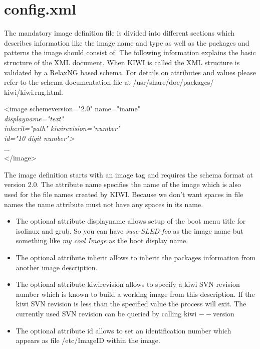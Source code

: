 \section{config.xml}
The mandatory image definition file is divided into different sections
which describes information like the image name and type as well as
the packages and patterns the image should consist of. The following
information explains the basic structure of the XML document. When KIWI
is called the XML structure is validated by a RelaxNG based schema.
For details on attributes and values please refer to the schema 
documentation file at /usr/share/doc/packages/ kiwi/kiwi.rng.html.

\begin{Command}{12cm}
<image schemeversion="2.0" name="iname"\\
\hspace*{1.9cm}\textit{displayname="text"}\\
\hspace*{1.9cm}\textit{inherit="path" kiwirevision="number"}\\
\hspace*{1.9cm}\textit{id="10 digit number">}\\
\hspace*{1cm}...\\
</image>
\end{Command}

The image definition starts with an image tag and requires the
schema format at version 2.0. The attribute name specifies the
name of the image which is also used for the file names created
by KIWI. Because we don't want spaces in file names the name
attribute must not have any spaces in its name.

\begin{itemize}
\item The optional attribute displayname allows setup of the boot
      menu title for isolinux and grub. So you can have
      \textit{suse-SLED-foo} as the image name but something like
      \textit{my cool Image} as the boot display name.
\item The optional attribute inherit allows to inherit the
      packages information from another image description.
\item The optional attribute kiwirevision allows to specify
      a kiwi SVN revision number which is known to build
      a working image from this description. If the kiwi SVN
      revision is less than the specified value the
      process will exit. The currently used SVN revision can
      be queried by calling kiwi $--$version
\item The optional attribute id allows to set an identification
      number which appears as file /etc/ImageID within the
      image.
\end{itemize}

